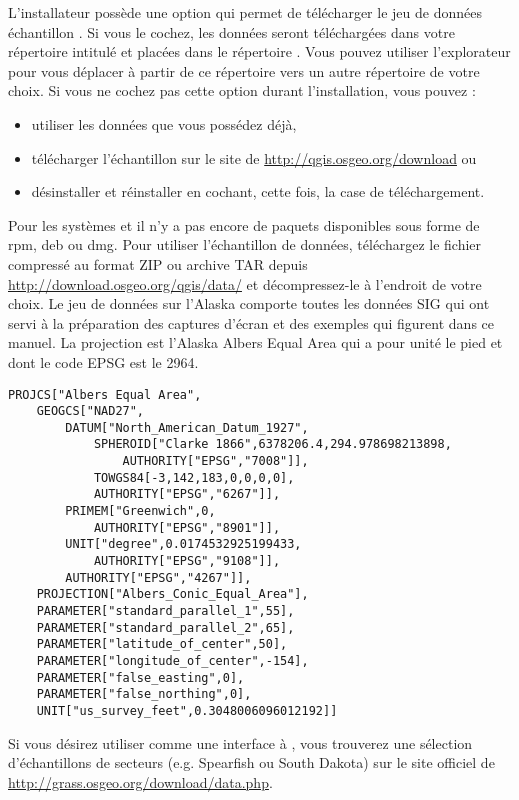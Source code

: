\win L'installateur \mswin possède une option qui permet de télécharger le jeu de données échantillon \qg.
Si vous le cochez, les données seront téléchargées dans votre répertoire intitulé  et placées dans le répertoire . Vous pouvez utiliser l'explorateur \mswin pour vous déplacer à partir de ce répertoire vers un autre répertoire de votre choix.
Si vous ne cochez pas cette option durant l'installation, vous pouvez :
\begin{itemize}[label=--]
\item utiliser les données que vous possédez déjà,
\item télécharger l'échantillon sur le site de \qg
 \url{http://qgis.osgeo.org/download} ou
\item désinstaller et réinstaller \qg en cochant, cette fois, la case de téléchargement.
\end{itemize}

\bigskip

\nix \osx Pour les systèmes \tux et \mac il n'y a pas encore de paquets disponibles sous forme de rpm, deb ou dmg. Pour utiliser l'échantillon de données, téléchargez le fichier compressé au format ZIP ou archive TAR depuis \url{http://download.osgeo.org/qgis/data/}
et décompressez-le à l'endroit de votre choix. Le jeu de données sur l'Alaska comporte toutes les données SIG qui ont servi à la préparation des captures d'écran et des exemples qui figurent dans ce manuel. La projection est l'Alaska Albers Equal Area qui a pour unité le pied et dont le code EPSG est le 2964.

\begin{verbatim}
PROJCS["Albers Equal Area",
    GEOGCS["NAD27",
        DATUM["North_American_Datum_1927",
            SPHEROID["Clarke 1866",6378206.4,294.978698213898,
                AUTHORITY["EPSG","7008"]],
            TOWGS84[-3,142,183,0,0,0,0],
            AUTHORITY["EPSG","6267"]],
        PRIMEM["Greenwich",0,
            AUTHORITY["EPSG","8901"]],
        UNIT["degree",0.0174532925199433,
            AUTHORITY["EPSG","9108"]],
        AUTHORITY["EPSG","4267"]],
    PROJECTION["Albers_Conic_Equal_Area"],
    PARAMETER["standard_parallel_1",55],
    PARAMETER["standard_parallel_2",65],
    PARAMETER["latitude_of_center",50],
    PARAMETER["longitude_of_center",-154],
    PARAMETER["false_easting",0],
    PARAMETER["false_northing",0],
    UNIT["us_survey_feet",0.3048006096012192]]
\end{verbatim}

Si vous désirez utiliser \qg comme une interface à \grass, vous trouverez une sélection d'échantillons de secteurs (e.g. Spearfish ou South Dakota) sur le site officiel de \grass \\
\url{http://grass.osgeo.org/download/data.php}. 

